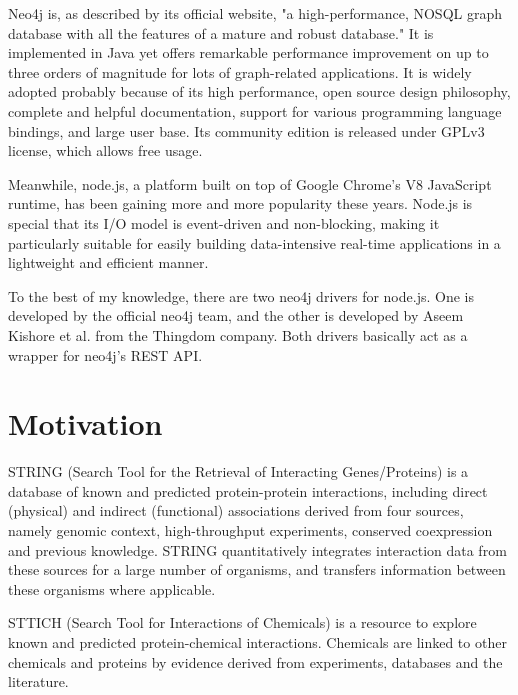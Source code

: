 \documentclass[10pt,conference,compsocconf]{../IEEEtran}
\begin{document}
Neo4j is, as described by its official website, "a high-performance, NOSQL graph database with all the features of a mature and robust database." It is implemented in Java yet offers remarkable performance improvement on up to three orders of magnitude for lots of graph-related applications. It is widely adopted probably because of its high performance, open source design philosophy, complete and helpful documentation, support for various programming language bindings, and large user base. Its community edition is released under GPLv3 license, which allows free usage.


Meanwhile, node.js, a platform built on top of Google Chrome's V8 JavaScript runtime, has been gaining more and more popularity these years. Node.js is special that its I/O model is event-driven and non-blocking, making it particularly suitable for easily building data-intensive real-time applications in a lightweight and efficient manner. 

To the best of my knowledge, there are two neo4j drivers for node.js. One is developed by the official neo4j team, and the other is developed by Aseem Kishore et al. from the Thingdom company. Both drivers basically act as a wrapper for neo4j's REST API.

\section{Motivation}

STRING (Search Tool for the Retrieval of Interacting Genes/Proteins) \citep{1070,1071,1072,1073,1074,1075} is a database of known and predicted protein-protein interactions, including direct (physical) and indirect (functional) associations derived from four sources, namely genomic context, high-throughput experiments, conserved coexpression and previous knowledge. STRING quantitatively integrates interaction data from these sources for a large number of organisms, and transfers information between these organisms where applicable.

STTICH (Search Tool for Interactions of Chemicals) \citep{1068,1069} is a resource to explore known and predicted protein-chemical interactions. Chemicals are linked to other chemicals and proteins by evidence derived from experiments, databases and the literature.
\end{document}
